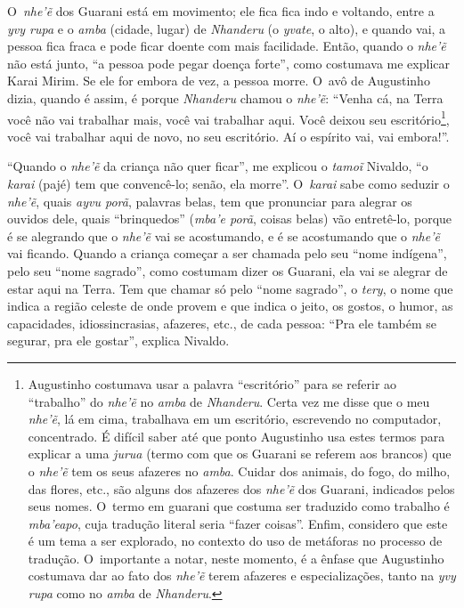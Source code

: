 O~\emph{nhe’ẽ} dos Guarani está em movimento; ele fica fica indo e
voltando, entre a \emph{yvy rupa} e o \emph{amba} (cidade, lugar) de \emph{Nhanderu} (o
\emph{yvate}, o alto), e quando vai, a pessoa fica fraca e pode ficar doente
com mais facilidade. Então, quando o \emph{nhe’ẽ} não está junto, ``a
pessoa pode pegar doença forte'', como costumava me explicar Karai
Mirim. Se ele for embora de vez, a pessoa morre. O~avô de Augustinho
dizia, quando é assim, é porque \emph{Nhanderu} chamou o \emph{nhe’ẽ}: ``Venha
cá, na Terra você não vai trabalhar mais, você vai trabalhar aqui. Você
deixou seu escritório\footnote{Augustinho costumava usar a palavra
``escritório'' para se referir ao ``trabalho'' do \emph{nhe’ẽ} no \emph{amba} de
\emph{Nhanderu}. Certa vez me disse que o meu \emph{nhe’ẽ}, lá em cima,
trabalhava em um escritório, escrevendo no computador, concentrado. É
difícil saber até que ponto Augustinho usa estes termos para explicar a
uma \emph{jurua} (termo com que os Guarani se referem aos brancos) que o
\emph{nhe’ẽ} tem os seus afazeres no \emph{amba}. Cuidar dos animais, do fogo,
do milho, das flores, etc., são alguns dos afazeres dos \emph{nhe’ẽ} dos
Guarani, indicados pelos seus nomes. O~termo em guarani que costuma ser
traduzido como trabalho é \emph{mba’eapo}, cuja tradução literal seria
``fazer coisas''. Enfim, considero que este é um tema a ser explorado, no
contexto do uso de metáforas no processo de tradução. O~importante a
notar, neste momento, é a ênfase que Augustinho costumava dar ao fato
dos \emph{nhe’ẽ} terem afazeres e especializações, tanto na \emph{yvy rupa} como
no \emph{amba} de \emph{Nhanderu}.}, você vai trabalhar aqui de novo, no seu
escritório. Aí o espírito vai, vai embora!''.

``Quando o \emph{nhe’ẽ} da criança não quer ficar'', me explicou o
\emph{tamoĩ} Nivaldo, ``o \emph{karai} (pajé) tem que convencê-lo; senão, ela
morre''. O~\emph{karai} sabe como seduzir o \emph{nhe’ẽ}, quais \emph{ayvu porã},
palavras belas, tem que pronunciar para alegrar os ouvidos dele, quais
``brinquedos'' (\emph{mba’e porã}, coisas belas) vão entretê-lo, porque é se
alegrando que o \emph{nhe’ẽ} vai se acostumando, e é se acostumando que
o \emph{nhe’ẽ} vai ficando. Quando a criança começar a ser chamada pelo
seu ``nome indígena'', pelo seu ``nome sagrado'', como costumam dizer os
Guarani, ela vai se alegrar de estar aqui na Terra. Tem que chamar só
pelo ``nome sagrado'', o \emph{tery}, o nome que indica a região celeste de onde
provem e que indica o jeito, os gostos, o humor, as capacidades,
idiossincrasias, afazeres, etc., de cada pessoa: ``Pra ele também se
segurar, pra ele gostar'', explica Nivaldo.

